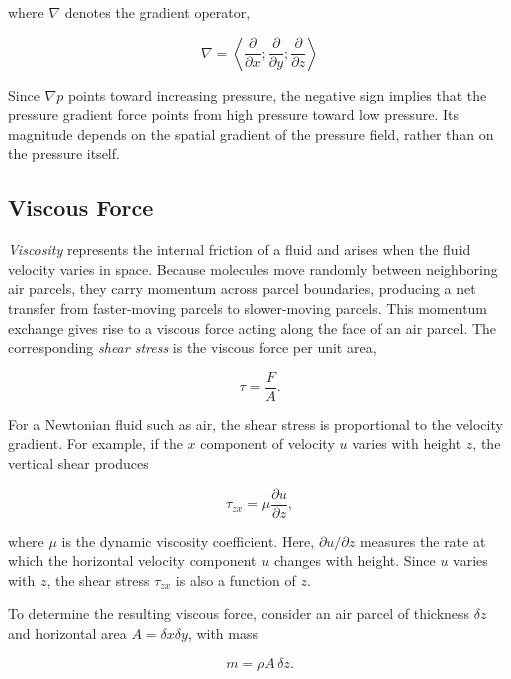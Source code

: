 \documentclass[10pt,twocolumn]{memoir}
\begin{document}
where $\nabla$ denotes the gradient operator,

\begin{equation}
    \nabla = \left<\frac{\partial}{\partial x}; \frac{\partial}{\partial y}; \frac{\partial}{\partial z}\right>
\end{equation}

Since $\nabla p$ points toward increasing pressure, the negative sign implies that the pressure gradient force points from high pressure toward low pressure. Its magnitude depends on the spatial gradient of the pressure field, rather than on the pressure itself.

\subsection{Viscous Force}

\textit{Viscosity} represents the internal friction of a fluid and arises when the fluid velocity varies in space. Because molecules move randomly between neighboring air parcels, they carry momentum across parcel boundaries, producing a net transfer from faster-moving parcels to slower-moving parcels. This momentum exchange gives rise to a viscous force acting along the face of an air parcel. The corresponding \textit{shear stress} is the viscous force per unit area,

\begin{equation}
    \tau = \frac{F}{A}.
\end{equation}

For a Newtonian fluid such as air, the shear stress is proportional to the velocity gradient. For example, if the $x$ component of velocity $u$ varies with height $z$, the vertical shear produces

\begin{equation}
    \tau_{zx} = \mu \frac{\partial u}{\partial z},
\end{equation}

where $\mu$ is the dynamic viscosity coefficient. Here, $\partial u/\partial z$ measures the rate at which the horizontal velocity component $u$ changes with height. Since $u$ varies with $z$, the shear stress $\tau_{zx}$ is also a function of $z$.

To determine the resulting viscous force, consider an air parcel of thickness $\delta z$ and horizontal area $A=\delta x \delta y$, with mass

\begin{equation}
    m = \rho A\,\delta z.
\end{equation}
\end{document}
